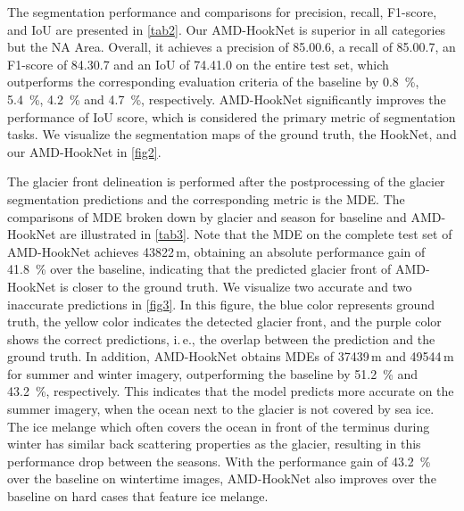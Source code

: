 \documentclass[lettersize,journal,siunitx]{IEEEtran}
\newcommand{\ie}{i.\,e.,\xspace}
\begin{document}
The segmentation performance and comparisons for precision, recall, F1-score, and IoU are presented in \cref{tab2}. Our AMD-HookNet is superior in all categories but the NA Area. Overall, it achieves a precision of 85.00.6, a recall of 85.00.7, an F1-score of 84.30.7 and an IoU of 74.41.0 on the entire test set, which outperforms the corresponding evaluation criteria of the baseline by \SI{0.8}{\percent}, \SI{5.4}{\percent}, \SI{4.2}{\percent} and \SI{4.7}{\percent}, respectively. AMD-HookNet significantly improves the performance of IoU score, which is considered the primary metric of segmentation tasks. We visualize the segmentation maps of the ground truth, the HookNet, and our AMD-HookNet in \cref{fig2}.

The glacier front delineation is performed after the postprocessing of the glacier segmentation predictions and the corresponding metric is the MDE. The comparisons of MDE broken down by glacier and season for baseline and AMD-HookNet are illustrated in \cref{tab3}. Note that the MDE on the complete test set of AMD-HookNet achieves 43822\,m, obtaining an absolute performance gain of \SI{41.8}{\percent} over the baseline, indicating that the predicted glacier front of AMD-HookNet is closer to the ground truth. We visualize two accurate and two inaccurate predictions in \cref{fig3}. In this figure, the blue color represents ground truth, the yellow color indicates the detected glacier front, and the purple color shows the correct predictions, \ie the overlap between the prediction and the ground truth. In addition, AMD-HookNet obtains MDEs of 37439\,m and 49544\,m for summer and winter imagery, outperforming the baseline by \SI{51.2}{\percent} and \SI{43.2}{\percent}, respectively. This indicates that the model predicts more accurate on the summer imagery, when the ocean next to the glacier is not covered by sea ice. The ice melange which often covers the ocean in front of the terminus during winter has similar back scattering properties as the glacier, resulting in this performance drop between the seasons. With the performance gain of \SI{43.2}{\percent} over the baseline on wintertime images, AMD-HookNet also improves over the baseline on hard cases that feature ice melange.
\end{document}
